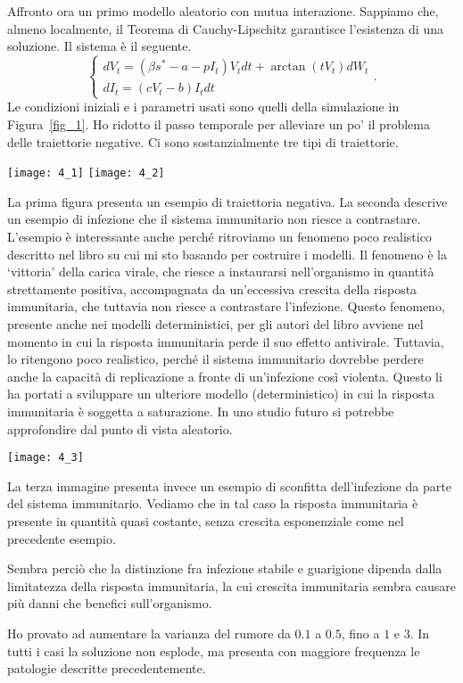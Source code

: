 \documentclass[12pt,a4paper,oneside]{amsart}
\theoremstyle{definition}
\begin{document}
Affronto ora un primo modello aleatorio con mutua interazione. Sappiamo che, almeno localmente, il Teorema di Cauchy-Lipschitz garantisce l'esistenza di una soluzione. Il sistema è il seguente.
\begin{equation}\tag{4}
\begin{cases}
dV_t=\left(\beta s^* -a -pI_t\right)V_tdt + \arctan(tV_t)dW_t\\
dI_t=\left(cV_t-b\right)I_tdt
\end{cases}.
\end{equation}
Le condizioni iniziali e i parametri usati sono quelli della simulazione in Figura~\ref{fig_1}. Ho ridotto il passo temporale per alleviare un po' il problema delle traiettorie negative. Ci sono sostanzialmente tre tipi di traiettorie.
\begin{center}
\texttt{[image: 4\_1]}
\texttt{[image: 4\_2]}
\end{center}
La prima figura presenta un esempio di traiettoria negativa. La seconda descrive un esempio di infezione che il sistema immunitario non riesce a contrastare. L'esempio è interessante anche perché ritroviamo un fenomeno poco realistico descritto nel libro su cui mi sto basando per costruire i modelli. Il fenomeno è la `vittoria' della carica virale, che riesce a instaurarsi nell'organismo in quantità strettamente positiva, accompagnata da un'eccessiva crescita della risposta immunitaria, che tuttavia non riesce a contrastare l'infezione. Questo fenomeno, presente anche nei modelli deterministici, per gli autori del libro avviene nel momento in cui la risposta immunitaria perde il suo effetto antivirale. Tuttavia, lo ritengono poco realistico, perché il sistema immunitario dovrebbe perdere anche la capacità di replicazione a fronte di un'infezione così violenta. Questo li ha portati a sviluppare un ulteriore modello (deterministico) in cui la risposta immunitaria è soggetta a saturazione. In uno studio futuro si potrebbe approfondire dal punto di vista aleatorio. 
\begin{center}
\texttt{[image: 4\_3]}
\end{center}
La terza immagine presenta invece un esempio di sconfitta dell'infezione da parte del sistema immunitario. Vediamo che in tal caso la risposta immunitaria è presente in quantità quasi costante, senza crescita esponenziale come nel precedente esempio.

Sembra perciò che la distinzione fra infezione stabile e guarigione dipenda dalla limitatezza della risposta immunitaria, la cui crescita immunitaria sembra causare più danni che benefici sull'organismo.

Ho provato ad aumentare la varianza del rumore da $0.1$ a $0.5$, fino a $1$ e $3$. In tutti i casi la soluzione non esplode, ma presenta con maggiore frequenza le patologie descritte precedentemente.
\end{document}
